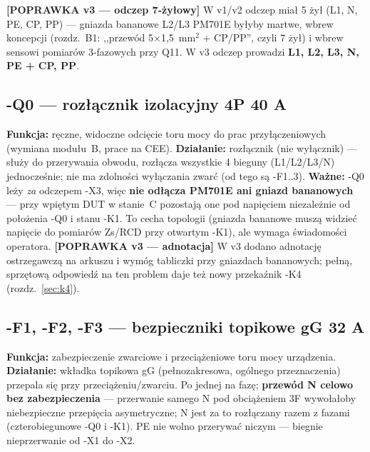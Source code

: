 \documentclass[11pt,a4paper]{article}
\newcommand{\popr}[1]{\textbf{\color{granat}[POPRAWKA v3 --- #1]}}
\begin{document}
\popr{odczep 7-żyłowy} W v1/v2 odczep miał 5 żył (L1, N, PE, CP, PP) --- gniazda bananowe L2/L3
PM701E byłyby martwe, wbrew koncepcji (rozdz.~B1: ,,przewód 5$\times$1,5~mm$^2$ + CP/PP'', czyli
7 żył) i wbrew sensowi pomiarów 3-fazowych przy Q11. W v3 odczep prowadzi
\textbf{L1, L2, L3, N, PE + CP, PP}.

\subsection{-Q0 --- rozłącznik izolacyjny 4P 40 A}
\textbf{Funkcja:} ręczne, widoczne odcięcie toru mocy do prac przyłączeniowych (wymiana modułu~B,
prace na CEE). \textbf{Działanie:} rozłącznik (nie wyłącznik) --- służy do przerywania obwodu,
rozłącza wszystkie 4 bieguny (L1/L2/L3/N) jednocześnie; nie ma zdolności wyłączania zwarć (od tego
są -F1..3). \textbf{Ważne:} -Q0 leży \emph{za} odczepem -X3, więc \textbf{nie odłącza PM701E ani
gniazd bananowych} --- przy wpiętym DUT w stanie~C pozostają one pod napięciem niezależnie od
położenia -Q0 i stanu -K1. To cecha topologii (gniazda bananowe muszą widzieć napięcie do pomiarów
Zs/RCD przy otwartym -K1), ale wymaga świadomości operatora. \popr{adnotacja} W v3 dodano
adnotację ostrzegawczą na arkuszu i wymóg tabliczki przy gniazdach bananowych; pełną,
sprzętową odpowiedź na ten problem daje też nowy przekaźnik -K4 (rozdz.~\ref{sec:k4}).

\subsection{-F1, -F2, -F3 --- bezpieczniki topikowe gG 32 A}
\textbf{Funkcja:} zabezpieczenie zwarciowe i przeciążeniowe toru mocy urządzenia.
\textbf{Działanie:} wkładka topikowa gG (pełnozakresowa, ogólnego przeznaczenia) przepala się
przy przeciążeniu/zwarciu. Po jednej na fazę; \textbf{przewód N celowo bez zabezpieczenia} ---
przerwanie samego N pod obciążeniem 3F wywołałoby niebezpieczne przepięcia asymetryczne;
N jest za to rozłączany razem z fazami (czterobiegunowe -Q0 i -K1). PE nie wolno przerywać niczym
--- biegnie nieprzerwanie od -X1 do -X2.
\end{document}
